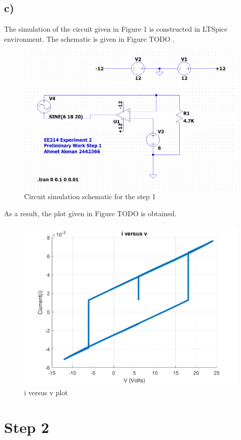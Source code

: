 \documentclass[letterpaper,12pt]{article}
\begin{document}
\subsection{c)}
The simulation of the circuit given in Figure 1 is constructed in LTSpice environment. The schematic is given in Figure TODO .
\begin{figure}[H]
    \centering
    \includegraphics[width=1\textwidth]{1sim.png}
\caption{Circuit simulation schematic  for the step 1}
\end{figure} 
As a result, the plot given in Figure TODO is obtained.
\begin{figure}[H]
    \centering
    \includegraphics[width=1\textwidth]{1.png}
\caption{i versus v plot} 
\end{figure} 
\section{Step 2}
\end{document}
